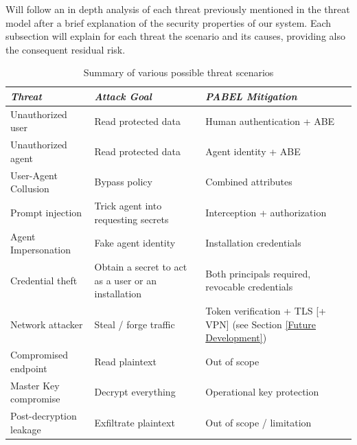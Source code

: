 Will follow an in depth analysis of each threat previously mentioned in the threat model after a brief explanation of the security properties of our system.
Each subsection will explain for each threat the scenario and its causes, providing also the consequent residual risk.

\begin{table}[H]
    \centering
    \begin{tabular}[c]{|>{\raggedright\arraybackslash}m{}|>{\raggedright\arraybackslash}m{}|>{\raggedright\arraybackslash}m{}|}
        \hline
        \textit{\textbf{Threat}} & \textit{\textbf{Attack Goal}}       & \textit{\textbf{PABEL Mitigation}}   \\ \hline
        Unauthorized user        & Read protected data                 & Human authentication + ABE           \\ \hline
        Unauthorized agent       & Read protected data                 & Agent identity + ABE                 \\ \hline
        User-Agent Collusion     & Bypass policy                       & Combined attributes                  \\ \hline
        Prompt injection         & Trick agent into requesting secrets & Interception + authorization         \\ \hline
        Agent Impersonation      & Fake agent identity                 & Installation credentials             \\ \hline
        Credential theft         & Obtain a secret to act as a user or an installation & Both principals required, revocable credentials \\ \hline
        Network attacker         & Steal / forge traffic               & \raggedright Token verification + TLS {[}+ VPN{]} (see Section \ref{Future Development})\arraybackslash \\ \hline
        Compromised endpoint     & Read plaintext                      & Out of scope                         \\ \hline
        Master Key compromise    & Decrypt everything                  & Operational key protection           \\ \hline
        Post-decryption leakage  & Exfiltrate plaintext                & Out of scope / limitation            \\ \hline
    \end{tabular}
    \caption{Summary of various possible threat scenarios}
\end{table}

